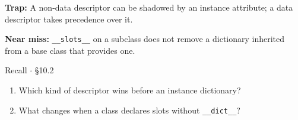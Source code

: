\documentclass[11pt]{article}
\begin{document}
\begin{keepsection}
\begin{notebox}\textbf{Trap:} A non-data descriptor can be shadowed by an instance attribute; a data descriptor takes precedence over it.\end{notebox}

\begin{notebox}\textbf{Near miss:} \texttt{\_\_slots\_\_} on a subclass does not remove a dictionary inherited from a base class that provides one.\end{notebox}

\begin{recallbox}{Recall \ensuremath{\cdot} §10.2}
\begin{enumerate}
\item Which kind of descriptor wins before an instance dictionary?
\item What changes when a class declares slots without \texttt{\_\_dict\_\_}?
\end{enumerate}

\end{recallbox}
\end{keepsection}
\end{document}
